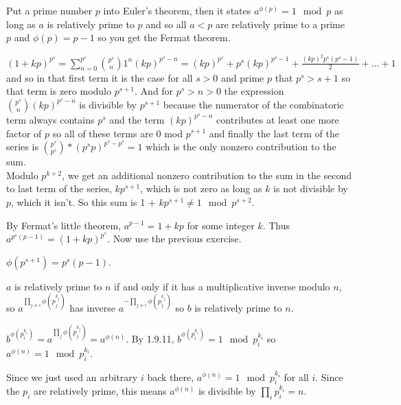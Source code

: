\documentclass[11pt, oneside]{article}   	%
\begin{document}
\ee
\item Put a prime number $p$ into Euler's theorem, then it states $a^{\phi(p)} = 1 \mod p$ as long as $a$ is relatively prime to $p$ and so all $a<p$ are relatively prime to a prime $p$ and $\phi(p) = p-1$ so you get the Fermat theorem.
\item $(1 + kp)^{p^s} = \sum_{n=0}^{p^s} {p^s \choose n} 1^n (kp)^{p^s - n} = (kp)^{p^s} + p^s(kp)^{p^s - 1} + \frac{(kp)^2 p^s(p^s - 1)}{2}  + \ldots + 1$ and so in that first term it is the case for all $s > 0$ and prime $p$ that $p^s > s+1$ so that term is zero modulo $p^{s+1}$. And for $p^s > n > 0$ the expression ${p^s \choose n}(kp)^{p^s - n}$ is divisible by $p^{s+1}$ because the numerator of the combinatoric term always contains $p^s$ and the term $(kp)^{p^s - n}$ contributes at least one more factor of $p$ so all of these terms are 0 mod $p^{s+1}$ and finally the last term of the series is ${p^s \choose p^s} * (p^sp)^{p^s - p^s} = 1$ which is the only nonzero contribution to the sum. \\ 
Modulo $p^{k+2}$, we get an additional nonzero contribution to the sum in the second to last term of the series, $kp^{s+1}$, which is not zero as long as $k$ is not divisible by $p$, which it isn't. So this sum is 1 + $kp^{s+1} \not= 1 \mod p^{s+2}$.
\item \be \item By Fermat's little theorem, $a^{p-1} = 1 + kp$ for some integer $k$. Thus $a^{p^s(p-1)} = (1 + kp)^{p^s}$. Now use the previous exercise. 
\item $\phi(p^{s+1}) = p^s(p-1)$.
\ee
\item \be \item $a$ is relatively prime to $n$ if and only if it has a multiplicative inverse modulo $n$, so $a^{\prod_{j \not = i}\phi(p_j^{k_j})}$ has inverse $a^{-\prod_{j \not = i}\phi(p_j^{k_j})}$ so $b$ is relatively prime to $n$.
\item $b^{\phi(p_i^{k_i})} = a^{\prod_j\phi(p_j^{k_j})} = a^{\phi(n)}$. By 1.9.11,  $b^{\phi(p_i^{k_i})} = 1 \mod p_i^{k_i}$ so $a^{\phi(n)} = 1 \mod p_i^{k_i}$.
\item  Since we just used an arbitrary $i$ back there, $a^{\phi(n)} = 1 \mod p_i^{k_i}$ for all $i$. Since the $p_i$ are relatively prime, this means $a^{\phi(n)}$ is divisible by $\prod_ip_i^{k_i} = n$.
\ee
\ee
\end{document}
